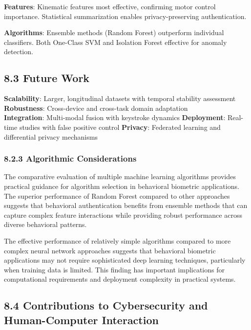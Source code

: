 \documentclass[
  11pt,
  a4paper,
]{article}
\begin{document}
\textbf{Features}: Kinematic features most effective, confirming motor
control importance. Statistical summarization enables privacy-preserving
authentication.

\textbf{Algorithms}: Ensemble methods (Random Forest) outperform
individual classifiers. Both One-Class SVM and Isolation Forest
effective for anomaly detection.

\subsection{8.3 Future Work}\label{future-work-1}

\textbf{Scalability}: Larger, longitudinal datasets with temporal
stability assessment \textbf{Robustness}: Cross-device and cross-task
domain adaptation\\
\textbf{Integration}: Multi-modal fusion with keystroke dynamics
\textbf{Deployment}: Real-time studies with false positive control
\textbf{Privacy}: Federated learning and differential privacy mechanisms

\subsubsection{8.2.3 Algorithmic
Considerations}\label{algorithmic-considerations}

The comparative evaluation of multiple machine learning algorithms
provides practical guidance for algorithm selection in behavioral
biometric applications. The superior performance of Random Forest
compared to other approaches suggests that behavioral authentication
benefits from ensemble methods that can capture complex feature
interactions while providing robust performance across diverse
behavioral patterns.

The effective performance of relatively simple algorithms compared to
more complex neural network approaches suggests that behavioral
biometric applications may not require sophisticated deep learning
techniques, particularly when training data is limited. This finding has
important implications for computational requirements and deployment
complexity in practical systems.

\subsection{8.4 Contributions to Cybersecurity and Human-Computer
Interaction}\label{contributions-to-cybersecurity-and-human-computer-interaction}
\end{document}
